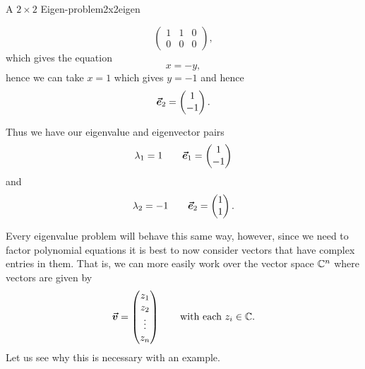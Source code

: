 \begin{ex}{A $2\times 2$ Eigen-problem}{2x2eigen}
\begin{itemize}
\[             \left( \begin{array}{cc|c} 1 & 1 & 0\\ 0 & 0 & 0 \end{array}\right),
             \]
             which gives the equation 
             \[
             x=-y,
             \]
             hence we can take $x=1$ which gives $y=-1$ and hence
             \[
             \boldsymbol{\vec{e}}_2 = \begin{pmatrix} 1 \\ -1 \end{pmatrix}.
             \]
         \end{itemize}
         Thus we have our eigenvalue and eigenvector pairs
         \[
         \lambda_1 = 1 \qquad \boldsymbol{\vec{e}}_1 = \begin{pmatrix} 1 \\ -1 \end{pmatrix}
         \]
         and
         \[
         \lambda_2 = -1 \qquad \boldsymbol{\vec{e}}_2 = \begin{pmatrix} 1 \\ 1 \end{pmatrix}.
         \]
        \end{ex}
        
        Every eigenvalue problem will behave this same way, however, since we need to factor polynomial equations it is best to now consider vectors that have complex entries in them. That is, we can more easily work over the vector space $\mathbb{C}^n$ where vectors are given by
        \[
        \boldsymbol{\boldsymbol{\vec{v}}} = \begin{pmatrix} z_1 \\ z_2 \\ \vdots \\ z_n \end{pmatrix} \qquad \textrm{with each $z_i\in \mathbb{C}$}.
        \]
        Let us see why this is necessary with an example.
        
